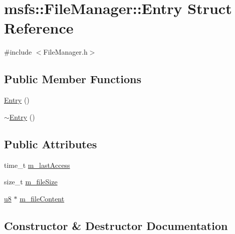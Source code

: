 \hypertarget{structmsfs_1_1_file_manager_1_1_entry}{}\section{msfs\+:\+:File\+Manager\+:\+:Entry Struct Reference}
\label{structmsfs_1_1_file_manager_1_1_entry}


{\ttfamily \#include $<$File\+Manager.\+h$>$}

\subsection*{Public Member Functions}
\begin{DoxyCompactItemize}
\item 
\hyperlink{structmsfs_1_1_file_manager_1_1_entry_a52b98ef1554c9afd09bfe25045decf5a}{Entry} ()
\item 
\hyperlink{structmsfs_1_1_file_manager_1_1_entry_ae89012c60ed76a8d39d9cb253e098cf4}{$\sim$\+Entry} ()
\end{DoxyCompactItemize}
\subsection*{Public Attributes}
\begin{DoxyCompactItemize}
\item 
time\+\_\+t \hyperlink{structmsfs_1_1_file_manager_1_1_entry_a97f8e8407f5b4a7ee0d0f06d9b166510}{m\+\_\+last\+Access}
\item 
size\+\_\+t \hyperlink{structmsfs_1_1_file_manager_1_1_entry_af47e284f91ae90e903f687b3013e2b93}{m\+\_\+file\+Size}
\item 
\hyperlink{_portable_8h_aed742c436da53c1080638ce6ef7d13de}{u8} $\ast$ \hyperlink{structmsfs_1_1_file_manager_1_1_entry_ab6d59ef2b2cf503136e6eee4be1ff36f}{m\+\_\+file\+Content}
\end{DoxyCompactItemize}


\subsection{Constructor \& Destructor Documentation}
\hypertarget{structmsfs_1_1_file_manager_1_1_entry_a52b98ef1554c9afd09bfe25045decf5a}{}
